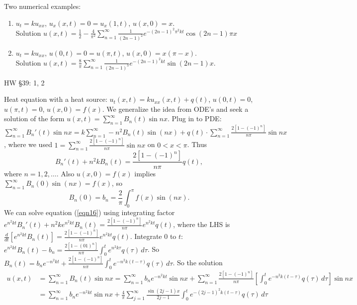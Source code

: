 \documentclass[]{article}
\begin{document}
\begin{example}
	Two numerical examples:
	\begin{enumerate}
		\item $u_t = ku_{xx}$, $u_x(x,t) = 0 = u_x(1,t)$, $u(x,0)=x$. \\Solution $u(x,t) = \frac{1}{2} - \frac{4}{\pi^2} \sum_{n=1}^\infty \frac{1}{(2n-1)^2} e^{-(2n-1)^2\pi^2 kt} \cos{(2n-1)\pi x}$
		\item $u_t = ku_{xx}$, $u(0,t) = 0 = u(\pi,t)$, $u(x,0) = x(\pi-x)$. \\Solution $u(x,t) = \frac{8}{\pi} \sum_{n=1}^\infty \frac{1}{(2n-1)^3} e^{-(2n-1)^2 kt} \sin{(2n-1)x}$.
	\end{enumerate}
\end{example}
HW \S39: 1, 2

\begin{example}
	Heat equation with a heat source:
	$u_t(x,t) = ku_{xx}(x,t) + q(t)$, $u(0,t) = 0$, $u(\pi,t) = 0$, $u(x,0)=f(x)$.
	We generalize the  idea from ODE's and seek a solution of the form $u(x,t) = \sum_{n=1}^\infty B_n(t) \sin{nx}$.
	Plug in to PDE: $\sum_{n=1}^\infty B_n'(t) \sin{nx} = k \sum_{n=1}^\infty -n^2 B_n(t) \sin{(nx)} + q(t) \cdot \sum_{n=1}^\infty \frac{2[1-(-1)^n]}{n\pi} \sin{nx}$, where we used $ 1= \sum_{n=1}^\infty \frac{2[1-(-1)^n]}{n\pi} \sin{nx}$ on $0<x<\pi$.
	Thus \begin{equation}
		B_n'(t) + n^2kB_n(t) = \frac{2[1-(-1)^n]}{n\pi}q(t),
		\label{eqn16}
	\end{equation} where $n=1,2,\dots$.
	Also $u(x,0) = f(x)$ implies $\sum_{n=1}^\infty B_n(0) \sin{(nx)} = f(x)$, so $$B_n(0) = b_n = \frac{2}{\pi} \int_0^\pi f(x) \sin{(nx)}.$$
	We can solve equation (\ref{eqn16}) using integrating factor $e^{n^2kt} B_n'(t) + n^2ke^{n^2kt} B_n(t) = \frac{2[1-(-1)^n]}{n\pi}e^{n^2kt} q(t)$, where the LHS is $\frac{d}{dt} \left[ e^{n^2kt} B_n(t) \right] = \frac{2[1-(-1)^n]}{n\pi} e^{n^2kt} q(t)$. Integrate 0 to $t$: $e^{n^2kt} B_n(t) - b_n = \frac{2[1-(01)^n]}{n\pi} \int_0^t e^{n^2k\tau} q(\tau) \, d\tau$. So $B_n(t) = b_n e^{-n^2kt} + \frac{2[1-(-1)^n]}{n\pi} \int_0^t e^{-n^2k(t-\tau)}q(\tau) \, d\tau$.
	So the solution
	\begin{align*}
		u(x,t) &= \sum_{n=1}^\infty B_n(t) \sin{nx} = \sum_{n=1}^\infty b_n e^{-n^2kt} \sin{nx} + \sum_{n=1}^\infty \frac{2[1-(-1)^n]}{n\pi} \left[ \int_0^t e^{-n^2k(t-\tau)} q(\tau) \, d\tau \right] \sin{nx} \\
		&=\sum_{n=1}^\infty b_n e^{-n^2kt} \sin{nx} + \frac{4}{\pi} \sum_{j=1}^\infty \frac{\sin{(2j-1)x}}{2j-1} \int_0^t e^{-(2j-1)^2k(t-\tau)} q(\tau) \, d\tau
	\end{align*}
\end{example}
\end{document}
